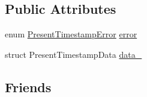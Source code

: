 \subsection*{\-Public \-Attributes}
\begin{DoxyCompactItemize}
\item 
enum \hyperlink{timestamp_8h_a460efbc7c0b935c6b51d98b8295e8dc0}{\-Present\-Timestamp\-Error} \hyperlink{structTimestamp_a2ac4b53468d2a270e2ba5f05af9d7472}{error}
\item 
struct \-Present\-Timestamp\-Data \hyperlink{structTimestamp_adf3177050edc50aa8b6e768922e4cf56}{data\-\_\-}
\end{DoxyCompactItemize}
\subsection*{\-Friends}
